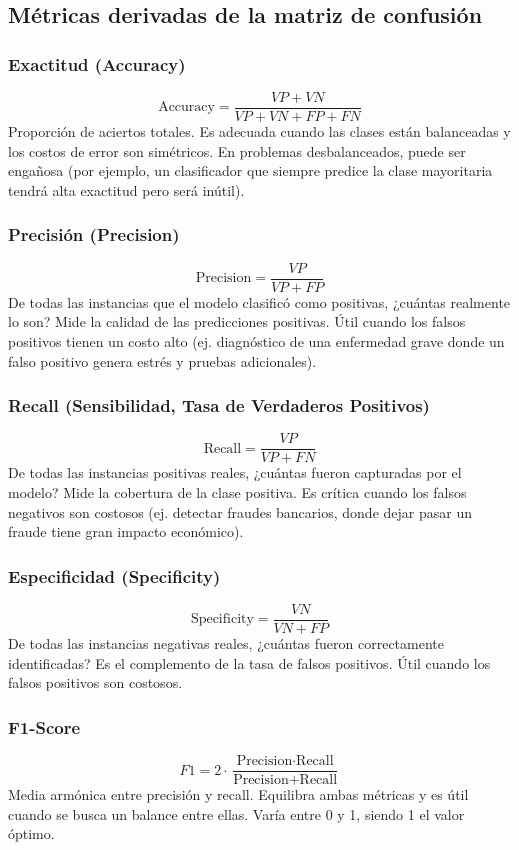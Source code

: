 \documentclass[12pt,a4paper,openany,oneside]{book}
\begin{document}
\subsection{Métricas derivadas de la matriz de confusión}

\subsubsection{Exactitud (Accuracy)}
\[
\text{Accuracy} = \frac{VP + VN}{VP + VN + FP + FN}
\]
Proporción de aciertos totales. Es adecuada cuando las clases están balanceadas y los costos de error son simétricos. En problemas desbalanceados, puede ser engañosa (por ejemplo, un clasificador que siempre predice la clase mayoritaria tendrá alta exactitud pero será inútil).

\subsubsection{Precisión (Precision)}
\[
\text{Precision} = \frac{VP}{VP + FP}
\]
De todas las instancias que el modelo clasificó como positivas, ¿cuántas realmente lo son? Mide la calidad de las predicciones positivas. Útil cuando los falsos positivos tienen un costo alto (ej. diagnóstico de una enfermedad grave donde un falso positivo genera estrés y pruebas adicionales).

\subsubsection{Recall (Sensibilidad, Tasa de Verdaderos Positivos)}
\[
\text{Recall} = \frac{VP}{VP + FN}
\]
De todas las instancias positivas reales, ¿cuántas fueron capturadas por el modelo? Mide la cobertura de la clase positiva. Es crítica cuando los falsos negativos son costosos (ej. detectar fraudes bancarios, donde dejar pasar un fraude tiene gran impacto económico).

\subsubsection{Especificidad (Specificity)}
\[
\text{Specificity} = \frac{VN}{VN + FP}
\]
De todas las instancias negativas reales, ¿cuántas fueron correctamente identificadas? Es el complemento de la tasa de falsos positivos. Útil cuando los falsos positivos son costosos.

\subsubsection{F1-Score}
\[
F1 = 2 \cdot \frac{\text{Precision} \cdot \text{Recall}}{\text{Precision} + \text{Recall}}
\]
Media armónica entre precisión y recall. Equilibra ambas métricas y es útil cuando se busca un balance entre ellas. Varía entre 0 y 1, siendo 1 el valor óptimo.
\end{document}

